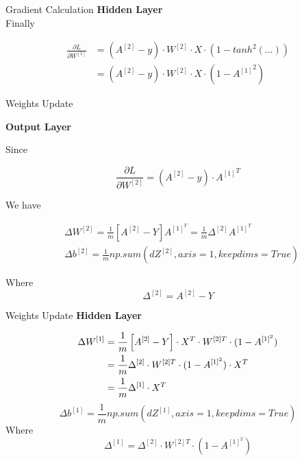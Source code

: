 \documentclass[11pt]{beamer}
\begin{document}
\begin{frame}{Gradient Calculation}
\textbf{Hidden Layer}\\
\vspace{0.5cm}
Finally
\begin{tcolorbox}
\begin{align*}
\frac{\partial L}{\partial W^{[1]}} &= (A^{[2]} - y) \cdot W^{[2]} \cdot X \cdot \left( 1 - tanh^2(\dots) \right) \\
&= (A^{[2]} - y) \cdot W^{[2]} \cdot X \cdot \left( 1 - {A^{[1]}}^2 \right)
\end{align*}
\end{tcolorbox}
\end{frame}
\begin{frame}{Weights Update}

\textbf{Output Layer}

Since

\begin{equation}
\frac{\partial L}{\partial W^{[2]}} = (A^{[2]} - y) \cdot {A^{[1]}}^T
\end{equation}

We have

\begin{align}
& \Delta W^{[2]} = \frac{1}{m}\left[A^{[2]} - Y \right]A^{[1]^T} = \frac{1}{m}\Delta^{[2]}A^{[1]^T} \\
& \Delta b^{[2]} = \frac{1}{m}np.sum(dZ^{[2]}, axis=1, keepdims=True) 
\end{align}

Where
\begin{equation} 
\Delta^{[2]} = A^{[2]} - Y  
\end{equation}
\end{frame}
\begin{frame}{Weights Update}
\textbf{Hidden Layer}

\begin{align}
\Delta W^{[1]} &= \frac{1}{m} \left[ A^{[2]} - Y \right] \cdot  X^{T} \cdot W^{[2]T} \cdot (1 - A^{[1]^2}) \notag\\
         &= \frac{1}{m} \Delta^{[2]} \cdot W^{[2]T} \cdot (1 - A^{[1]^2}) \cdot  X^{T}   \notag\\
         &= \frac{1}{m} \Delta^{[1]} \cdot  X^{T} 
\end{align}
\begin{equation} 
\Delta b^{[1]} = \frac{1}{m}np.sum(dZ^{[1]}, axis=1, keepdims=True)  
\end{equation}
Where
$$\Delta^{[1]} = \Delta^{[2]} \cdot W^{[2]T} \cdot (1 - A^{[1]^2})$$
\end{frame}
\end{document}
